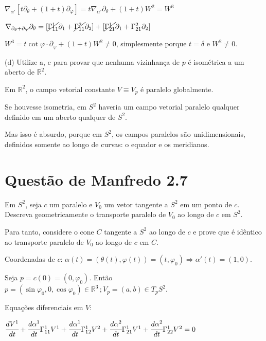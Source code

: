 \documentclass[12pt]{article}
\begin{document}
		$\nabla_{\alpha'} [t \partial_\theta + (1 + t) \partial_\varphi] = t \nabla_{\alpha'} \partial_\theta + (1 + t) W^2 = W^3$

		$\nabla_{\partial_\theta + \partial \varphi} \partial_\theta = [\cancel{\Gamma_{11}^1} \partial_1 + \cancel{\Gamma_{11}^2} \partial_2] + [\cancel{\Gamma_{21}^1} \partial_1 + \Gamma_{21}^2 \partial_2]$

		$W^3 = t \cot \varphi \cdot \partial_\varphi  + (1 + t) W^2 \ne 0$, simplesmente porque $t = \delta$ e $W^2 \ne 0$.

		\vspace{3mm}

		(d) Utilize a, c para provar que nenhuma vizinhan\c{c}a de $p$ \'e isom\'etrica a um aberto de $\mathbb{R}^2$.

		Em $\mathbb{R}^2$, o campo vetorial constante $V \equiv V_p$ \'e paralelo globalmente.

		Se houvesse isometria, em $S^2$ haveria um campo vetorial paralelo qualquer definido em um aberto qualquer de $S^2$.

		Mas isso \'e absurdo, porque em $S^2$, os campos paralelos s\~ao unidimensionais, definidos somente ao longo de curvas: o equador e os meridianos.

	\section{Quest\~ao de Manfredo 2.7}
		\begin{flushright}
		\end{flushright}

		Em $S^2$, seja $c$ um paralelo e $V_0$ um vetor tangente a $S^2$ em um ponto de $c$. Descreva geometricamente o transporte paralelo de $V_0$ ao longo de $c$ em $S^2$.

		Para tanto, considere o cone $C$ tangente a $S^2$ ao longo de $c$ e prove que \'e id\^entico ao transporte paralelo de $V_0$ ao longo de $c$ em $C$.

		\vspace{3mm}

		Coordenadas de $c$: $\alpha(t) = (\theta(t), \varphi(t)) = (t, \varphi_0) \Rightarrow \alpha'(t) = (1, 0)$.

		Seja $p = c(0) = (0, \varphi_0)$. Ent\~ao $p = (\sin \varphi_0, 0, \cos \varphi_0) \in \mathbb{R}^3\,; V_p = (a, b) \in T_pS^2$.

		Equa\c{c}\~oes diferenciais em $V$:

		$\cfrac{dV^1}{dt} + \cfrac{d\alpha^1}{dt} \Gamma_{11}^1 V^1  + \cfrac{d\alpha^1}{dt} \Gamma_{12}^1 V^2  + \cfrac{d\alpha^2}{dt} \Gamma_{21}^1 V^1  + \cfrac{d\alpha^2}{dt} \Gamma_{22}^1 V^2 = 0$
\end{document}
